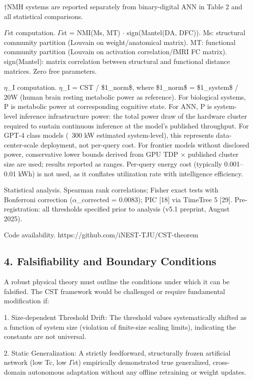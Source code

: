 \documentclass[a4paper,12pt]{article}
\begin{document}
†NMH systems are reported separately from binary-digital ANN in Table 2 and all statistical comparisons.


$\Gamma$st computation. $\Gamma$st = NMI(Ms, MT) $\cdot$ sign(Mantel(DA, DFC)). Ms: structural community partition (Louvain on weight/anatomical matrix). MT: functional community partition (Louvain on activation correlation/fMRI FC matrix). sign(Mantel): matrix correlation between structural and functional distance matrices. Zero free parameters.


$\eta$_I computation. $\eta$_I = CST / \$1_{norm}\$, where \$1_{norm}\$ = \$1_{system}\$ / 20W (human brain resting metabolic power as reference). For biological systems, P is metabolic power at corresponding cognitive state. For ANN, P is system-level inference infrastructure power: the total power draw of the hardware cluster required to sustain continuous inference at the model's published throughput. For GPT-4 class models (~300 kW estimated system-level), this represents data-center-scale deployment, not per-query cost. For frontier models without disclosed power, conservative lower bounds derived from GPU TDP $\times$ published cluster size are used; results reported as ranges. Per-query energy cost (typically 0.001--0.01 kWh) is not used, as it conflates utilization rate with intelligence efficiency.


Statistical analysis. Spearman rank correlations; Fisher exact tests with Bonferroni correction ($\alpha$_corrected = 0.0083); PIC [18] via TimeTree 5 [29]. Pre-registration: all thresholds specified prior to analysis (v5.1 preprint, August 2025).


Code availability. https://github.com/iNEST-TJU/CST-theorem



\subsection{4. Falsifiability and Boundary Conditions}

A robust physical theory must outline the conditions under which it can be falsified. The CST framework would be challenged or require fundamental modification if:


1. Size-dependent Threshold Drift: The threshold values systematically shifted as a function of system size (violation of finite-size scaling limits), indicating the constants are not universal.


2. Static Generalization: A strictly feedforward, structurally frozen artificial network (low Tc, low $\Gamma$st) empirically demonstrated true generalized, cross-domain autonomous adaptation without any offline retraining or weight updates.
\end{document}
